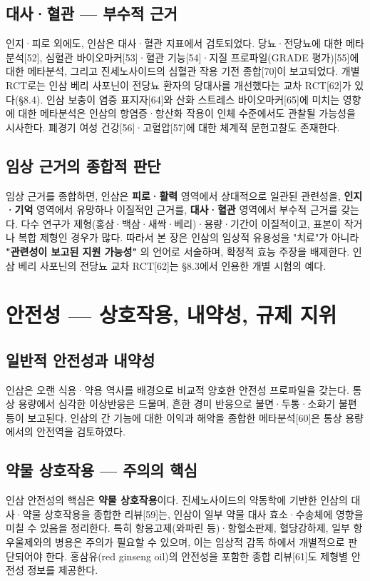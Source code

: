 \documentclass[11pt,oneside]{book}
\begin{document}
\subsection{대사·혈관 — 부수적 근거}
인지·피로 외에도, 인삼은 대사·혈관 지표에서 검토되었다. 당뇨·전당뇨에 대한 메타분석[52], 심혈관 바이오마커[53]·혈관 기능[54]·지질 프로파일(GRADE 평가)[55]에 대한 메타분석, 그리고 진세노사이드의 심혈관 작용 기전 종합[70]이 보고되었다. 개별 RCT로는 인삼 베리 사포닌이 전당뇨 환자의 당대사를 개선했다는 교차 RCT[62]가 있다(§8.4). 인삼 보충이 염증 표지자[64]와 산화 스트레스 바이오마커[65]에 미치는 영향에 대한 메타분석은 인삼의 항염증·항산화 작용이 인체 수준에서도 관찰될 가능성을 시사한다. 폐경기 여성 건강[56]·고혈압[57]에 대한 체계적 문헌고찰도 존재한다.

\subsection{임상 근거의 종합적 판단}
임상 근거를 종합하면, 인삼은 \textbf{피로·활력} 영역에서 상대적으로 일관된 관련성을, \textbf{인지·기억} 영역에서 유망하나 이질적인 근거를, \textbf{대사·혈관} 영역에서 부수적 근거를 갖는다. 다수 연구가 제형(홍삼·백삼·새싹·베리)·용량·기간이 이질적이고, 표본이 작거나 복합 제형인 경우가 많다. 따라서 본 장은 인삼의 임상적 유용성을 "치료"가 아니라 \textbf{"관련성이 보고된 지원 가능성"} 의 언어로 서술하며, 확정적 효능 주장을 배제한다. 인삼 베리 사포닌의 전당뇨 교차 RCT[62]는 §8.3에서 인용한 개별 시험의 예다.

\section{안전성 — 상호작용, 내약성, 규제 지위}
\subsection{일반적 안전성과 내약성}
인삼은 오랜 식용·약용 역사를 배경으로 비교적 양호한 안전성 프로파일을 갖는다. 통상 용량에서 심각한 이상반응은 드물며, 흔한 경미 반응으로 불면·두통·소화기 불편 등이 보고된다. 인삼의 간 기능에 대한 이익과 해악을 종합한 메타분석[60]은 통상 용량에서의 안전역을 검토하였다.

\subsection{약물 상호작용 — 주의의 핵심}
인삼 안전성의 핵심은 \textbf{약물 상호작용}이다. 진세노사이드의 약동학에 기반한 인삼의 대사·약물 상호작용을 종합한 리뷰[59]는, 인삼이 일부 약물 대사 효소·수송체에 영향을 미칠 수 있음을 정리한다. 특히 항응고제(와파린 등)·항혈소판제, 혈당강하제, 일부 항우울제와의 병용은 주의가 필요할 수 있으며, 이는 임상적 감독 하에서 개별적으로 판단되어야 한다. 홍삼유(red ginseng oil)의 안전성을 포함한 종합 리뷰[61]도 제형별 안전성 정보를 제공한다.
\end{document}
